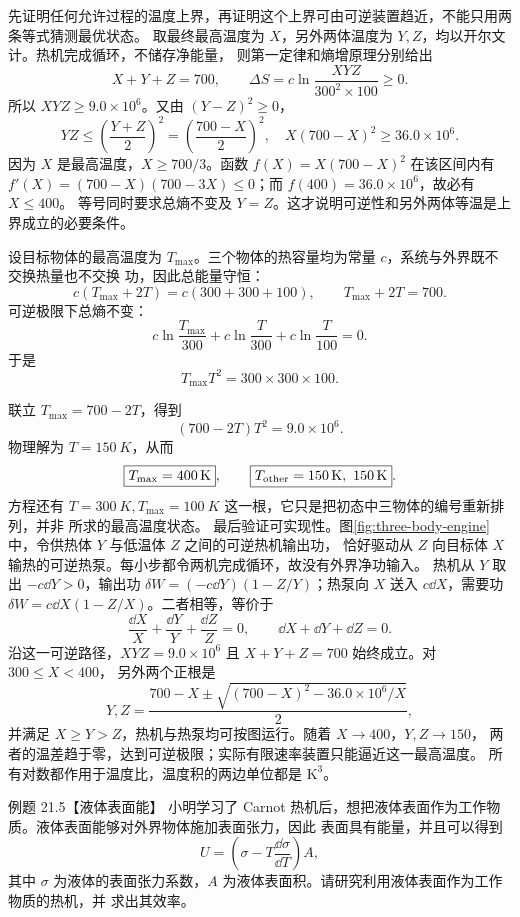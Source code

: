 \begin{xesolution}
先证明任何允许过程的温度上界，再证明这个上界可由可逆装置趋近，不能只用两条等式猜测最优状态。
取最终最高温度为 $X$，另外两体温度为 $Y,Z$，均以开尔文计。热机完成循环，不储存净能量，
则第一定律和熵增原理分别给出
\[
 X+Y+Z=700,\qquad
 \Delta S=c\ln\frac{XYZ}{300^2\times100}\ge0.
\]
所以 $XYZ\ge9.0\times10^6$。又由 $(Y-Z)^2\ge0$，
\[
 YZ\le\left(\frac{Y+Z}{2}\right)^2=\left(\frac{700-X}{2}\right)^2,
 \quad X(700-X)^2\ge36.0\times10^6.
\]
因为 $X$ 是最高温度，$X\ge700/3$。函数 $f(X)=X(700-X)^2$ 在该区间内有
$f'(X)=(700-X)(700-3X)\le0$；而 $f(400)=36.0\times10^6$，故必有 $X\le400$。
等号同时要求总熵不变及 $Y=Z$。这才说明可逆性和另外两体等温是上界成立的必要条件。

设目标物体的最高温度为 $T_{\max}$。三个物体的热容量均为常量 $c$，系统与外界既不交换热量也不交换
功，因此总能量守恒：
\[
  c(T_{\max}+2T)=c(300+300+100),
  \qquad T_{\max}+2T=700.
\]
可逆极限下总熵不变：
\[
  c\ln\frac{T_{\max}}{300}
  +c\ln\frac{T}{300}
  +c\ln\frac{T}{100}=0.
\]
于是
\[
  T_{\max}T^2=300\times300\times100.
\]

\threeBodiesDiagram
{}\label{fig:three-body-engine}

联立 $T_{\max}=700-2T$，得到
\[
  (700-2T)T^2=9.0\times10^6.
\]
物理解为 $T=\SI{150}{K}$，从而
\[
  \boxed{T_{\max}=\SI{400}{K}},
  \qquad
  \boxed{T_{\rm other}=\SI{150}{K},\ \SI{150}{K}}.
\]
方程还有 $T=\SI{300}{K},T_{\max}=\SI{100}{K}$ 这一根，它只是把初态中三物体的编号重新排列，并非
所求的最高温度状态。
最后验证可实现性。图\ref{fig:three-body-engine}中，令供热体 $Y$ 与低温体 $Z$ 之间的可逆热机输出功，
恰好驱动从 $Z$ 向目标体 $X$ 输热的可逆热泵。每小步都令两机完成循环，故没有外界净功输入。
热机从 $Y$ 取出 $-c\dd Y>0$，输出功
$\delta W=(-c\dd Y)(1-Z/Y)$；热泵向 $X$ 送入 $c\dd X$，需要功
$\delta W=c\dd X(1-Z/X)$。二者相等，等价于
\[
 \frac{\dd X}{X}+\frac{\dd Y}{Y}+\frac{\dd Z}{Z}=0,
 \qquad \dd X+\dd Y+\dd Z=0.
\]
沿这一可逆路径，$XYZ=9.0\times10^6$ 且 $X+Y+Z=700$ 始终成立。对 $300\le X<400$，
另外两个正根是
\[
 Y,Z=\frac{700-X\pm\sqrt{(700-X)^2-36.0\times10^6/X}}{2},
\]
并满足 $X\ge Y>Z$，热机与热泵均可按图运行。随着 $X\to400$，$Y,Z\to150$，
两者的温差趋于零，达到可逆极限；实际有限速率装置只能逼近这一最高温度。
所有对数都作用于温度比，温度积的两边单位都是 $\mathrm K^3$。
\end{xesolution}

\begin{origexamplebox}{例题 21.5【液体表面能】}
小明学习了 Carnot 热机后，想把液体表面作为工作物质。液体表面能够对外界物体施加表面张力，因此
表面具有能量，并且可以得到
\[
  U=\left(\sigma-T\frac{\dd\sigma}{\dd T}\right)A,
\]
其中 $\sigma$ 为液体的表面张力系数，$A$ 为液体表面积。请研究利用液体表面作为工作物质的热机，并
求出其效率。
\end{origexamplebox}

